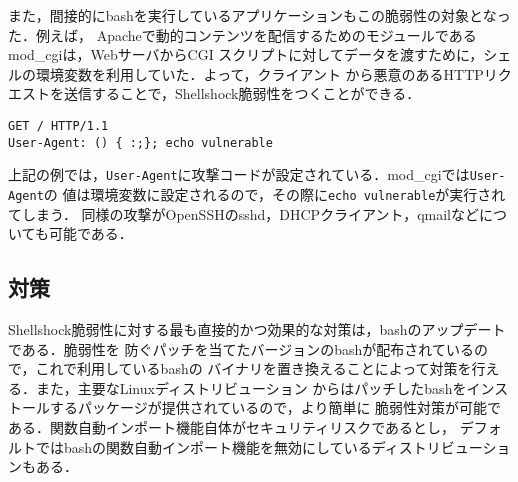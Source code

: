 また，間接的にbashを実行しているアプリケーションもこの脆弱性の対象となった．例えば，
Apacheで動的コンテンツを配信するためのモジュールであるmod\_cgiは，WebサーバからCGI
スクリプトに対してデータを渡すために，シェルの環境変数を利用していた．よって，クライアント
から悪意のあるHTTPリクエストを送信することで，Shellshock脆弱性をつくことができる．

\begin{verbatim}
GET / HTTP/1.1
User-Agent: () { :;}; echo vulnerable
\end{verbatim}

上記の例では，\texttt{User-Agent}に攻撃コードが設定されている．mod\_cgiでは\texttt{User-Agent}の
値は環境変数に設定されるので，その際に\texttt{echo vulnerable}が実行されてしまう．
同様の攻撃がOpenSSHのsshd，DHCPクライアント，qmailなどについても可能である．

\subsection{対策}

Shellshock脆弱性に対する最も直接的かつ効果的な対策は，bashのアップデートである．脆弱性を
防ぐパッチを当てたバージョンのbashが配布されているので，これで利用しているbashの
バイナリを置き換えることによって対策を行える．また，主要なLinuxディストリビューション
からはパッチしたbashをインストールするパッケージが提供されているので，より簡単に
脆弱性対策が可能である．関数自動インポート機能自体がセキュリティリスクであるとし，
デフォルトではbashの関数自動インポート機能を無効にしているディストリビューションもある．\cite{freebsd}
